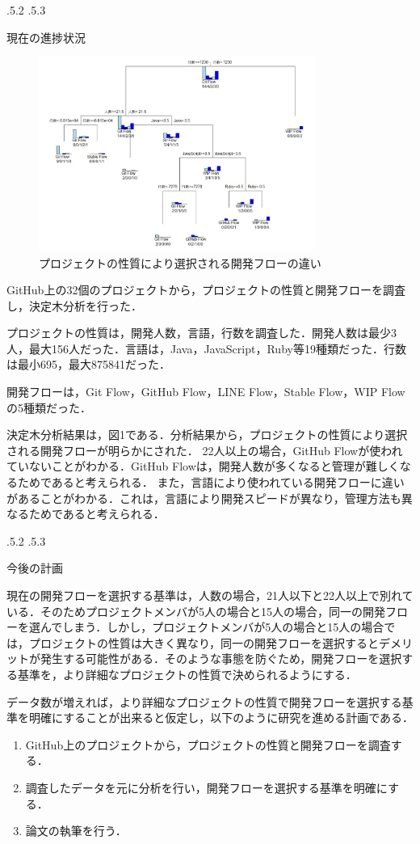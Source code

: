 \documentclass[uplatex,twocolumn]{jsarticle}
\makeatletter
\renewcommand{\section}{%
    \if@slide\clearpage\fi
    \@startsection{section}{1}{\z@}%
    {\Cvs \@plus.5\Cdp \@minus.2\Cdp}%
    {.5\Cvs \@plus.3\Cdp}%
    {\normalfont\raggedright}}
\makeatother
\begin{document}
\section{現在の進捗状況}

\begin{figure}[H]
\includegraphics[width=9cm,clip]{images.pdf}
\caption{プロジェクトの性質により選択される開発フローの違い}\label{決定木}
\end{figure}


GitHub上の32個のプロジェクトから，プロジェクトの性質と開発フローを調査し，決定木分析を行った．

プロジェクトの性質は，開発人数，言語，行数を調査した．開発人数は最少3人，最大156人だった．言語は，Java，JavaScript，Ruby等19種類だった．行数は最小695，最大875841だった．


開発フローは，Git Flow，GitHub Flow，LINE Flow，Stable Flow，WIP Flowの5種類だった．

決定木分析結果は，図1である．分析結果から，プロジェクトの性質により選択される開発フローが明らかにされた．
22人以上の場合，GitHub Flowが使われていないことがわかる．GitHub Flowは，開発人数が多くなると管理が難しくなるためであると考えられる．
また，言語により使われている開発フローに違いがあることがわかる．これは，言語により開発スピードが異なり，管理方法も異なるためであると考えられる．





\section{今後の計画}


現在の開発フローを選択する基準は，人数の場合，21人以下と22人以上で別れている．そのためプロジェクトメンバが5人の場合と15人の場合，同一の開発フローを選んでしまう．しかし，プロジェクトメンバが5人の場合と15人の場合では，プロジェクトの性質は大きく異なり，同一の開発フローを選択するとデメリットが発生する可能性がある．そのような事態を防ぐため，開発フローを選択する基準を，より詳細なプロジェクトの性質で決められるようにする．

データ数が増えれば，より詳細なプロジェクトの性質で開発フローを選択する基準を明確にすることが出来ると仮定し，以下のように研究を進める計画である．

\begin{enumerate}
\item GitHub上のプロジェクトから，プロジェクトの性質と開発フローを調査する．
\item 調査したデータを元に分析を行い，開発フローを選択する基準を明確にする．
\item 論文の執筆を行う．
\end{enumerate}

\end{document}

